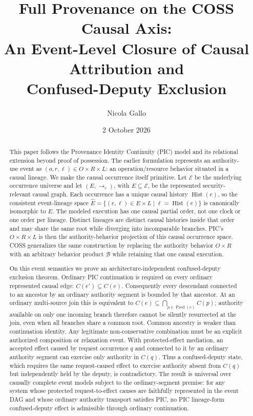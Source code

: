\documentclass[10pt,twocolumn]{article}
\title{Full Provenance on the COSS Causal Axis:\\
An Event-Level Closure of Causal Attribution and\\
Confused-Deputy Exclusion}
\author{Nicola Gallo}
\date{2 October 2026}
\newcommand{\Hist}{\operatorname{Hist}}
\newcommand{\Pred}{\operatorname{Pred}}
\begin{document}
\maketitle

\begin{abstract}
This paper follows the Provenance Identity Continuity (PIC) model and its
relational extension beyond proof of possession.  The earlier formulation
represents an authority-use event as $(o,r,\ell)\in O\times R\times L$: an
operation/resource behavior situated in a causal lineage.  We make the causal
occurrence itself primitive.  Let $\mathcal E$ be the underlying occurrence
universe and let $(E,\to_c)$, with $E\subseteq\mathcal E$, be the represented
security-relevant causal graph.  Each occurrence has a unique causal history
$\Hist(e)$, so the consistent event-lineage space
$\widehat E=\{(e,\ell)\in E\times L\mid \ell=\Hist(e)\}$ is canonically
isomorphic to $E$.  The modeled execution has one causal partial order, not one
clock or one order per lineage.  Distinct lineages are distinct causal
histories inside that order and may share the same root while diverging into
incomparable branches.  PIC's $O\times R\times L$ is then the
authority-behavior projection of this causal occurrence space.  COSS
generalizes the same construction by replacing the authority behavior
$O\times R$ with an arbitrary behavior product $\mathcal B$ while retaining
that one causal execution.

On this event semantics we prove an architecture-independent confused-deputy
exclusion theorem.  Ordinary PIC continuation is required on every ordinary represented
causal edge: $C(e')\subseteq C(e)$.  Consequently every descendant connected
to an ancestor by an ordinary authority segment is bounded by that ancestor.
At an ordinary multi-source join this is
equivalent to $C(e)\subseteq\bigcap_{p\in\Pred(e)}C(p)$; authority available
on only one incoming branch therefore cannot be silently resurrected at the
join, even when all branches share a common root.  Common ancestry is weaker
than continuation identity.  Any legitimate non-conservative combination must
be an explicit authorized composition or relaxation event.  With
protected-effect mediation, an accepted effect caused by request occurrence
$q$ and connected to it by an ordinary authority segment can exercise only
authority in $C(q)$.  Thus a confused-deputy state, which requires the same request-caused effect to
exercise authority absent from $C(q)$ but independently held by the deputy, is
contradictory.  The result is universal over causally complete event models subject to the
ordinary-segment premise: for any system whose protected request-to-effect causes are faithfully
represented in the event DAG and whose ordinary authority transport satisfies
PIC, no PIC lineage-form confused-deputy effect is admissible through
ordinary continuation.


\end{abstract}
\end{document}
